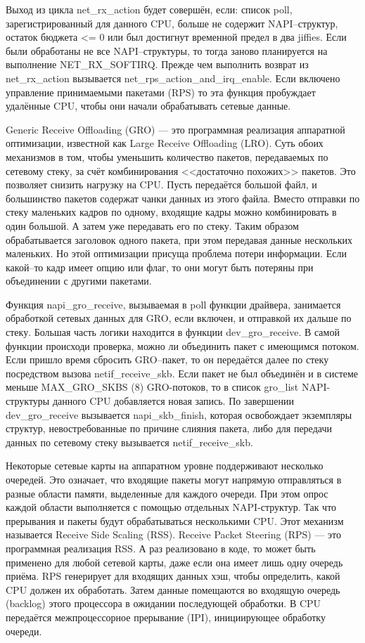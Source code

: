Выход из цикла net\_rx\_action будет совершён, если: список poll, зарегистрированный для данного CPU, больше не содержит NAPI--структур, остаток бюджета <= 0 или был достигнут временной предел в два jiffies. Если были обработаны не все NAPI--структуры, то тогда заново планируется на выполнение NET\_RX\_SOFTIRQ. Прежде чем выполнить возврат из net\_rx\_action вызывается net\_rps\_action\_and\_irq\_enable. Если включено управление принимаемыми пакетами (RPS) то эта функция пробуждает удалённые CPU, чтобы они начали обрабатывать сетевые данные.

Generic Receive Offloading (GRO) — это программная реализация аппаратной оптимизации, известной как Large Receive Offloading (LRO). Суть обоих механизмов в том, чтобы уменьшить количество пакетов, передаваемых по сетевому стеку, за счёт комбинирования <<достаточно похожих>> пакетов. Это позволяет снизить нагрузку на CPU. Пусть передаётся большой файл, и большинство пакетов содержат чанки данных из этого файла. Вместо отправки по стеку маленьких кадров по одному, входящие кадры можно комбинировать в один большой. А затем уже передавать его по стеку. Таким образом обрабатывается заголовок одного пакета, при этом передавая данные нескольких маленьких. Но этой оптимизации присуща проблема потери информации. Если какой--то кадр имеет опцию или флаг, то они могут быть потеряны при объединении с другими пакетами.

Функция napi\_gro\_receive, вызываемая в poll функции драйвера, занимается обработкой сетевых данных для GRO, если включен, и отправкой их дальше по стеку. Большая часть логики находится в функции dev\_gro\_receive. В самой функции происходи проверка, можно ли объединить пакет с имеющимся потоком. Если пришло время сбросить GRO--пакет, то он передаётся далее по стеку посредством вызова netif\_receive\_skb. Если пакет не был объединён и в системе меньше MAX\_GRO\_SKBS (8) GRO-потоков, то в список gro\_list NAPI-структуры данного CPU добавляется новая запись. По завершении dev\_gro\_receive вызывается napi\_skb\_finish, которая освобождает экземпляры структур, невостребованные по причине слияния пакета, либо для передачи данных по сетевому стеку вызывается netif\_receive\_skb.

Некоторые сетевые карты на аппаратном уровне поддерживают несколько очередей. Это означает, что входящие пакеты могут напрямую отправляться в разные области памяти, выделенные для каждого очереди. При этом опрос каждой области выполняется с помощью отдельных NAPI-структур. Так что прерывания и пакеты будут обрабатываться несколькими CPU. Этот механизм называется Receive Side Scaling (RSS). Receive Packet Steering (RPS) --- это программная реализация RSS. А раз реализовано в коде, то может быть применено для любой сетевой карты, даже если она имеет лишь одну очередь приёма. RPS генерирует для входящих данных хэш, чтобы определить, какой CPU должен их обработать. Затем данные помещаются во входящую очередь (backlog) этого процессора в ожидании последующей обработки. В CPU передаётся межпроцессорное прерывание (IPI), инициирующее обработку очереди.

